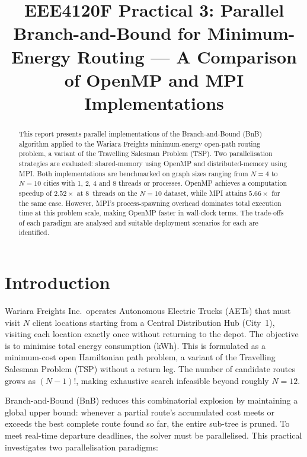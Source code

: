 \documentclass[conference]{IEEEtran}
\begin{document}
\title{EEE4120F Practical 3: Parallel Branch-and-Bound for Minimum-Energy
Routing ---
A Comparison of OpenMP and MPI Implementations}

\author{
\and
{}
}

\maketitle

\begin{abstract}
This report presents parallel implementations of
the Branch-and-Bound (BnB) algorithm applied to the Wariara
Freights minimum-energy open-path routing problem, a variant of
the Travelling Salesman Problem (TSP). Two parallelisation strategies are
evaluated: shared-memory using OpenMP and distributed-memory using MPI. Both
implementations are benchmarked on graph sizes ranging from $N{=}4$ to
$N{=}10$ cities with 1, 2, 4 and 8 threads or processes.
OpenMP achieves a computation speedup of $2.52\times$ at 8~threads on the
$N{=}10$ dataset, while MPI attains $5.66\times$ for the same case. However,
MPI's process-spawning overhead dominates total execution time at this
problem scale, making OpenMP faster in wall-clock terms.
The trade-offs of each paradigm are analysed and suitable deployment
scenarios for each are identified.
\end{abstract}

\section{Introduction}

Wariara Freights Inc.\ operates Autonomous Electric Trucks (AETs) that must
visit $N$ client locations starting from a Central Distribution Hub (City~1),
visiting each location exactly once without returning to the depot. The
objective is to minimise total energy consumption (kWh). This is formulated as
a minimum-cost open Hamiltonian path problem, a variant of the
Travelling Salesman Problem (TSP) without a return leg. The number of
candidate routes grows as $(N{-}1)!$, making exhaustive search infeasible
beyond roughly $N = 12$.

Branch-and-Bound (BnB) reduces this combinatorial explosion by maintaining a
global upper bound: whenever a partial route's accumulated cost meets or
exceeds the best complete route found so far, the entire sub-tree is pruned.
To meet real-time departure deadlines, the solver must be parallelised. This
practical investigates two parallelisation paradigms:
\end{document}
